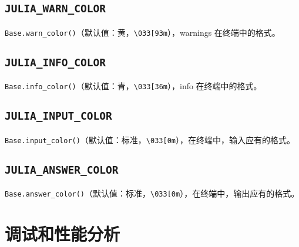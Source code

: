 \subsection{\texttt{JULIA\_WARN\_COLOR}}



\texttt{Base.warn\_color()}（默认值：黄，\texttt{{\textquotedbl}{\textbackslash}033[93m{\textquotedbl}}），warnings 在终端中的格式。



\hypertarget{10994657891761481518}{}


\subsection{\texttt{JULIA\_INFO\_COLOR}}



\texttt{Base.info\_color()}（默认值：青，\texttt{{\textquotedbl}{\textbackslash}033[36m{\textquotedbl}}），info 在终端中的格式。



\hypertarget{7277467062996316804}{}


\subsection{\texttt{JULIA\_INPUT\_COLOR}}



\texttt{Base.input\_color()}（默认值：标准，\texttt{{\textquotedbl}{\textbackslash}033[0m{\textquotedbl}}），在终端中，输入应有的格式。



\hypertarget{11974933399373427924}{}


\subsection{\texttt{JULIA\_ANSWER\_COLOR}}



\texttt{Base.answer\_color()}（默认值：标准，\texttt{{\textquotedbl}{\textbackslash}033[0m{\textquotedbl}}），在终端中，输出应有的格式。



\hypertarget{14262570954781492291}{}


\section{调试和性能分析}



\hypertarget{8362221794188602098}{}


